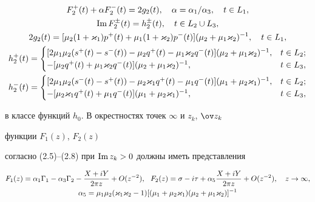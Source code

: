 \begin{gather} 


F^+_2(t)+\alpha F^-_2(t)=2g_2(t),\quad \alpha=\alpha_1/\alpha_3, 


\quad t\in L_1,\\ 


\im F^\pm_2(t)=h^\pm_2(t),\quad t\in L_2\cup L_3,\notag \\ 


2g_2(t)=[\mu_2(1+\varkappa_1)p^+(t)+\mu_1(1+\varkappa_2) 


p^-(t)](\mu_2+\mu_1\varkappa_2)^{-1},\quad t\in L_1,\notag \\ 


h^+_2(t)= 


\begin{cases} 


[2\mu_1\mu_2(s^+(t)-s^-(t))-\mu_2q^+(t)-\mu_1\varkappa_2q^-(t)] 


(\mu_2+\mu_1\varkappa_2)^{-1}, & t\in L_2;\\ 


-[\mu_2q^+(t)+\mu_1\varkappa_2q^-(t)](\mu_2+\mu_1\varkappa_2 


)^{-1}, & t\in L_3, 


\end{cases} 


\notag \\ 


h^-_2(t)= 


\begin{cases} 


[2\mu_1\mu_2(s^-(t)-s^+(t))-\mu_2\varkappa_1 


q^+(t)-\mu_1q^-(t)] 


(\mu_1+\mu_2\varkappa_1)^{-1}, & t\in L_2;\\ 


-[\mu_2\varkappa_1 


q^+(t)+\mu_1q^-(t)](\mu_1+\mu_2\varkappa_1 


)^{-1}, & t\in L_3,\notag 


\end{cases} 


\end{gather} 


в классе функций $h_0$. В окрестностях точек $\infty$ и $z_k$, $\ov z_k$ 


функции $F_1(z)$, $F_2(z)$ 


согласно (2.5)--(2.8) при $\operatorname{Im} z_k>0$ должны иметь представления 


\begin{gather} 


F_1(z)=\alpha_1\Gamma_1-\alpha_3\Gamma_2-\frac{X+iY}{2\pi z} 


+O(z^{-2}),\ \ F_2(z)=\sigma-i\tau+\alpha_5\frac{X+iY}{2\pi z}+ 


O(z^{-2}),\quad z\to \infty,\\ 


\alpha_5=\mu_1\mu_2(\varkappa_1\varkappa_2-1) 


[(\mu_1+\mu_2\varkappa_1)(\mu_2+\mu_1\varkappa_2)]^{-1}\notag 


\end{gather} 


